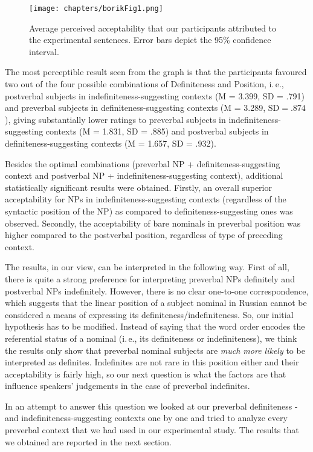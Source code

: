 \documentclass[output=paper]{langsci/langscibook}
\begin{document}
\begin{figure}[H]
\centering
\texttt{[image: chapters/borikFig1.png]}
\caption{Average perceived acceptability that our participants attributed to the experimental sentences. Error bars depict the 95\% confidence interval.}\label{2fig:1}
\end{figure}

{
The most perceptible result seen from the graph is that the participants favoured two out of the four possible combinations of Definiteness and Position, i.\,e., postverbal subjects in indefiniteness-suggesting contexts (M = 3.399, SD = .791) and preverbal subjects in definiteness-suggesting contexts (M = 3.289, $\text{SD} = .874$), giving substantially lower ratings to preverbal subjects in indefiniteness-suggesting contexts (M = 1.831, SD = .885) and postverbal subjects in definiteness-suggesting contexts (M = 1.657, SD = .932).
}

Besides the optimal combinations (preverbal NP + definiteness-suggesting context and postverbal NP + indefiniteness-suggesting context), additional statistically significant results were obtained. Firstly, an overall superior acceptability for NPs in indefiniteness-suggesting contexts (regardless of the syntactic position of the NP) as compared to definiteness-suggesting ones was observed. Secondly, the acceptability of bare nominals in preverbal position was higher compared to the postverbal position, regardless of type of preceding context.

The results, in our view, can be interpreted in the following way. First of all, there is quite a strong preference for interpreting preverbal NPs definitely and postverbal NPs indefinitely. However, there is no clear one-to-one correspondence, which suggests that the linear position of a subject nominal in Russian cannot be considered a means of expressing its definiteness/indefiniteness. So, our initial hypothesis has to be modified. Instead of saying that the word order encodes the referential status of a nominal (i.\,e., its definiteness or indefiniteness), we think the results only show that preverbal nominal subjects are {\emph{much more likely}} to be interpreted as definites. Indefinites are not rare in this position either and their acceptability is fairly high, so our next question is what the factors are that influence speakers' judgements in the case of preverbal indefinites. 

In an attempt to answer this question we looked at our preverbal definiteness \hspace*{-0.33em}- and indefiniteness-suggesting contexts one by one and tried to analyze every preverbal context that we had used in our experimental study. The results that we obtained are reported in the next section.
\end{document}
